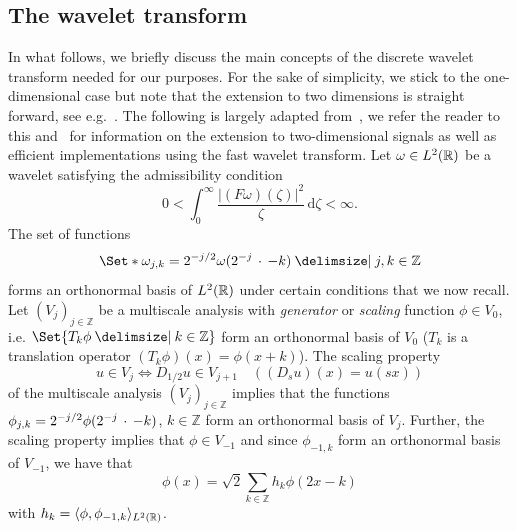 \subsection{The wavelet transform}%
\label{ssec:wavelet transform}
In what follows, we briefly discuss the main concepts of the discrete wavelet transform needed for our purposes.
For the sake of simplicity, we stick to the one-dimensional case but note that the extension to two dimensions is straight forward, see e.g.~\cite[chapter 4.4]{bredies_mathematical_2018}.
The following is largely adapted from~\cite{bredies_mathematical_2018}, we refer the reader to this and~\cite{mallat_multiresolution_1989,vetterli1995wavelets} for information on the extension to two-dimensional signals as well as efficient implementations using the fast wavelet transform.
Let \( \omega \in L^{\num{2}}(\mathbb{R}) \) be a wavelet satisfying the admissibility condition
\begin{equation}
	\num{0} < \int_{\num{0}}^\infty \frac{|(F\omega)(\zeta)|^{\num{2}}}{\zeta}\,\mathrm{d}\zeta < \infty.
\end{equation}
The set of functions
\begin{equation}
	\Set*{\omega_{j, k} = \num{2}^{-j/\num{2}} \omega(\num{2}^{-j}\argm - k) \given j, k \in \mathbb{Z}}
	\label{eq:l2 basis}
\end{equation}
forms an orthonormal basis of \( L^{\num{2}}(\mathbb{R}) \) under certain conditions that we now recall.
Let \( (V_j)_{j\in\mathbb{Z}} \) be a multiscale analysis with \emph{generator} or \emph{scaling} function \( \phi \in V_{\num{0}} \), i.e. \( \Set{T_k \phi \given k \in \mathbb{Z}} \) form an orthonormal basis of \( V_{\num{0}} \) (\( T_k \) is a translation operator \( (T_k \phi)(x) = \phi(x + k) \)).
The scaling property
\begin{equation}
	u \in V_j \iff D_{\num{1}/\num{2}}u\in V_{j+1} \quad((D_s u)(x) = u(sx))
\end{equation}
of the multiscale analysis \( (V_j)_{j\in\mathbb{Z}} \) implies that the functions \( \phi_{j, k} = \num{2}^{-j/\num{2}}\phi(\num{2}^{-j}\,\cdot\, - k) \), \( k \in \mathbb{Z} \) form an orthonormal basis of \( V_j \).
Further, the scaling property implies that \( \phi \in V_{-1} \) and since \( \phi_{-1, k} \) form an orthonormal basis of \( V_{-1} \), we have that
\begin{equation}
	\phi(x) = \sqrt{\num{2}}\sum_{k\in\mathbb{Z}} h_k \phi(\num{2}x - k)
\end{equation}
with \( h_k = \langle \phi, \phi_{-1, k} \rangle_{L^{\num{2}}(\mathbb{R})} \).
